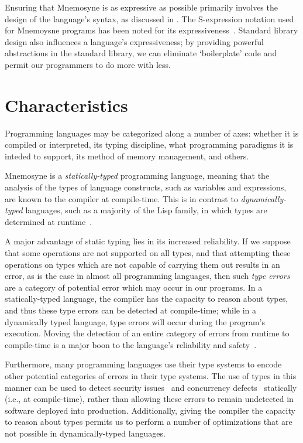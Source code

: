 Ensuring that Mnemosyne is as expressive as possible primarily involves the design of the language's syntax, as discussed in . The S-expression notation used for Mnemoysne programs has been noted for its expressiveness~\cite{sicp,raymond2003become}. Standard library design also influences a language's expressiveness; by providing powerful abstractions in the standard library, we can eliminate `boilerplate' code and permit our programmers to do more with less.

\section{Characteristics} \label{sec:characteristics}

Programming languages may be categorized along a number of axes: whether it is compiled or interpreted, its typing discipline, what programming paradigms it is inteded to support, its method of memory management, and others.

Mnemosyne is a \textit{statically-typed} programming language, meaning that the analysis of the types of language constructs, such as variables and expressions, are known to the compiler at compile-time. This is in contrast to \textit{dynamically-typed} languages, such as a majority of the Lisp family, in which types are determined at runtime~\cite{Mitchell:2003:TT:1074100.1074885}.

A major advantage of static typing lies in its increased reliability. If we suppose that some operations are not supported on all types, and that attempting these operations on types which are not capable of carrying them out results in an error, as is the case in almost all programming languages, then such \textit{type errors} are a category of potential error which may occur in our programs. In a statically-typed language, the compiler has the capacity to reason about types, and thus these type errors can be detected at compile-time; while in a dynamically typed language, type errors will occur during the program's execution. Moving the detection of an entire category of errors from runtime to compile-time is a major boon to the language's reliability and safety~\cite{Mitchell:2003:TT:1074100.1074885,Mayer:2012:ESI:2398857.2384666}.

Furthermore, many programming languages use their type systems to encode other potential categories of errors in their type systems. The use of types in this manner can be used to detect security issues~\cite{Skalka:2000:SES:357766.351244} and concurrency defects~\cite{Sagonas:2010:USA:2175429.2175432} statically (i.e., at compile-time), rather than allowing these errors to remain undetected in software deployed into production. Additionally, giving the compiler the capacity to reason about types permits us to perform a number of optimizations that are not possible in dynamically-typed languages.

